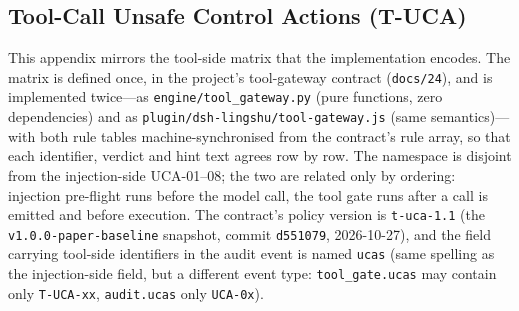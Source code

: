 
\subsection{Tool-Call Unsafe Control Actions ({T-UCA})}\label{app:tuca}

This appendix mirrors the tool-side matrix that the implementation encodes. The
matrix is defined once, in the project's tool-gateway contract
(\texttt{docs/24}), and is implemented twice---as \texttt{engine/\allowbreak{}tool\_\allowbreak{}gateway.\allowbreak{}py}
(pure functions, zero dependencies) and as
\texttt{plugin/\allowbreak{}dsh-\allowbreak{}lingshu/\allowbreak{}tool-\allowbreak{}gateway.\allowbreak{}js} (same semantics)---with both rule
tables machine-synchronised from the contract's rule array, so that each
identifier, verdict and hint text agrees row by row. The namespace is disjoint
from the injection-side UCA-01--08; the two are related only by ordering:
injection pre-flight runs before the model call, the tool gate runs after a call
is emitted and before execution. The contract's policy version is
\texttt{t-uca-1.1} (the \texttt{v1.0.0-paper-baseline} snapshot, commit
\texttt{d551079}, 2026-10-27), and the field carrying tool-side identifiers in the audit
event is named \texttt{ucas} (same spelling as the injection-side field, but a
different event type: \texttt{tool\_gate.ucas} may contain only
\texttt{T-UCA-xx}, \texttt{audit.ucas} only \texttt{UCA-0x}).

